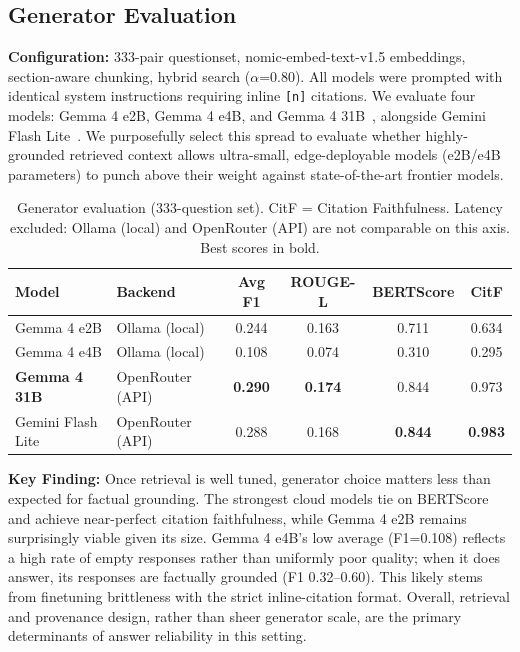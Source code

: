 \documentclass[11pt,a4paper]{article}
\begin{document}
\subsection{Generator Evaluation}

\textbf{Configuration:} 333-pair questionset, nomic-embed-text-v1.5 embeddings, section-aware chunking, hybrid search ($\alpha$=0.80). All models were prompted with identical system instructions requiring inline \texttt{[n]} citations. We evaluate four models: Gemma 4 e2B, Gemma 4 e4B, and Gemma 4 31B~\cite{gemma2024}, alongside Gemini Flash Lite~\cite{gemini2023}. We purposefully select this spread to evaluate whether highly-grounded retrieved context allows ultra-small, edge-deployable models (e2B/e4B parameters) to punch above their weight against state-of-the-art frontier models.

\begin{table}[h]
\caption{Generator evaluation (333-question set). CitF = Citation Faithfulness. Latency excluded: Ollama (local) and OpenRouter (API) are not comparable on this axis. Best scores in bold.}
\label{tab:generator}
\centering
\begin{tabular}{llcccc}
\toprule
\textbf{Model} & \textbf{Backend} & \textbf{Avg F1} & \textbf{ROUGE-L} & \textbf{BERTScore} & \textbf{CitF} \\
\midrule
Gemma 4 e2B & Ollama (local)      & 0.244 & 0.163 & 0.711 & 0.634 \\
Gemma 4 e4B & Ollama (local)      & 0.108 & 0.074 & 0.310 & 0.295 \\
\textbf{Gemma 4 31B}   & OpenRouter (API)    & \textbf{0.290} & \textbf{0.174} & 0.844 & 0.973 \\
Gemini Flash Lite & OpenRouter (API) & 0.288 & 0.168 & \textbf{0.844} & \textbf{0.983} \\
\bottomrule
\end{tabular}

\end{table}

\textbf{Key Finding:} Once retrieval is well tuned, generator choice matters less than expected for factual grounding. The strongest cloud models tie on BERTScore and achieve near-perfect citation faithfulness, while Gemma 4 e2B remains surprisingly viable given its size. Gemma 4 e4B's low average (F1=0.108) reflects a high rate of empty responses rather than uniformly poor quality; when it does answer, its responses are factually grounded (F1 0.32--0.60). This likely stems from finetuning brittleness with the strict inline-citation format. Overall, retrieval and provenance design, rather than sheer generator scale, are the primary determinants of answer reliability in this setting.
\end{document}
